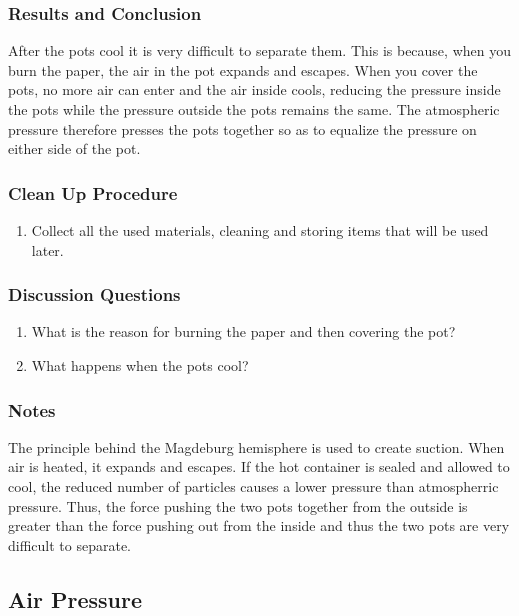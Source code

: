 \subsubsection*{Results and Conclusion}
After the pots cool it is very difficult to separate them. This is because, when you burn the paper, the air in the pot expands and escapes. When you cover the pots, no more air can enter and the air inside cools, reducing the pressure inside the pots while the pressure outside the pots remains the same. The atmospheric pressure therefore presses the pots together so as to equalize the pressure on either side of the pot. 



\subsubsection*{Clean Up Procedure}
\begin{enumerate}
\item{Collect all the used materials, cleaning and storing items that will be used later.} 
\end{enumerate}

\subsubsection*{Discussion Questions}
\begin{enumerate}
\item{What is the reason for burning the paper and then covering the pot?}
\item{What happens when the pots cool?}
\end{enumerate}

\subsubsection*{Notes}
The principle behind the Magdeburg hemisphere is used to create suction. When air is heated, it expands and escapes. If the hot container is sealed and allowed to cool, the reduced number of particles causes a lower pressure than atmospherric pressure. Thus, the force pushing the two pots together from the outside is greater than the force pushing out from the inside and thus the two pots are very difficult to separate. 


\subsection{Air Pressure}

